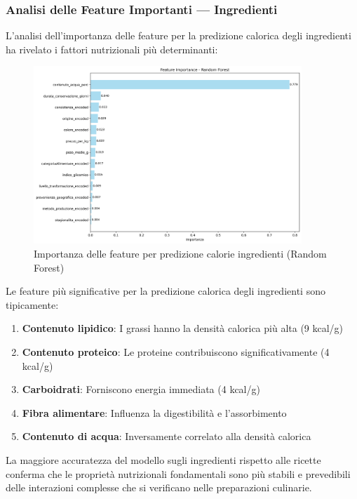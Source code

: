 \documentclass[12pt,a4paper]{article}
\begin{document}
\subsubsection{Analisi delle Feature Importanti --- Ingredienti}

L'analisi dell'importanza delle feature per la predizione calorica degli ingredienti ha rivelato i fattori nutrizionali più determinanti:

\begin{figure}[H]
\centering
\includegraphics[width=0.9\textwidth]{dati/feature_importance_rf.png}
\caption{Importanza delle feature per predizione calorie ingredienti (Random Forest)}
\label{fig:feature_importance_ingredienti}
\end{figure}

Le feature più significative per la predizione calorica degli ingredienti sono tipicamente:
\begin{enumerate}
    \item \textbf{Contenuto lipidico}: I grassi hanno la densità calorica più alta (9 kcal/g)
    \item \textbf{Contenuto proteico}: Le proteine contribuiscono significativamente (4 kcal/g)
    \item \textbf{Carboidrati}: Forniscono energia immediata (4 kcal/g)
    \item \textbf{Fibra alimentare}: Influenza la digestibilità e l'assorbimento
    \item \textbf{Contenuto di acqua}: Inversamente correlato alla densità calorica
\end{enumerate}

La maggiore accuratezza del modello sugli ingredienti rispetto alle ricette conferma che le proprietà nutrizionali fondamentali sono più stabili e prevedibili delle interazioni complesse che si verificano nelle preparazioni culinarie.
\end{document}

